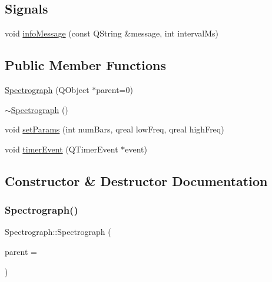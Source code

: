 \subsection*{Signals}
\begin{DoxyCompactItemize}
\item 
void \hyperlink{class_spectrograph_a1046b17fbd22d0724f06d461acb77bef}{info\+Message} (const Q\+String \&message, int interval\+Ms)
\end{DoxyCompactItemize}
\subsection*{Public Member Functions}
\begin{DoxyCompactItemize}
\item 
\hyperlink{class_spectrograph_afcfc87c4b07094a705dabb1b43c366ee}{Spectrograph} (Q\+Object $\ast$parent=0)
\item 
\hyperlink{class_spectrograph_aede83dadf66ffca77b01b023ee35d8b6}{$\sim$\+Spectrograph} ()
\item 
void \hyperlink{class_spectrograph_a5eba417e888dc0871f5ad1348849b693}{set\+Params} (int num\+Bars, qreal low\+Freq, qreal high\+Freq)
\item 
void \hyperlink{class_spectrograph_a9141c4da693b8c00d4ab8d9b5ba6e670}{timer\+Event} (Q\+Timer\+Event $\ast$event)
\end{DoxyCompactItemize}


\subsection{Constructor \& Destructor Documentation}
\hypertarget{class_spectrograph_afcfc87c4b07094a705dabb1b43c366ee}{}\label{class_spectrograph_afcfc87c4b07094a705dabb1b43c366ee} 
\subsubsection{\texorpdfstring{Spectrograph()}{Spectrograph()}}
{\footnotesize\ttfamily Spectrograph\+::\+Spectrograph (\begin{DoxyParamCaption}\item[{Q\+Object $\ast$}]{parent = {} }\end{DoxyParamCaption})\hspace{0.3cm}{\ttfamily [explicit]}}

\hypertarget{class_spectrograph_aede83dadf66ffca77b01b023ee35d8b6}{}\label{class_spectrograph_aede83dadf66ffca77b01b023ee35d8b6} 
